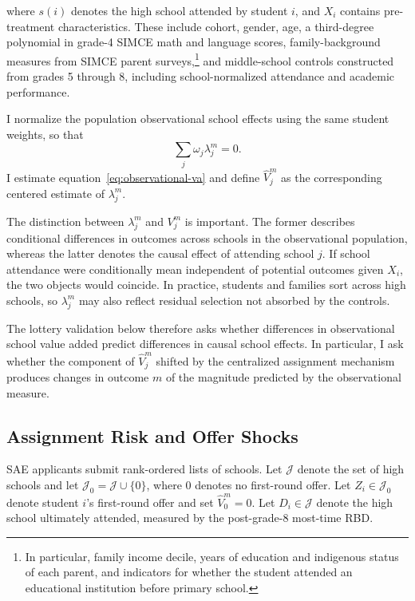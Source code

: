 \documentclass[a4paper, article, english, oneside, unknownkeysallowed, 12pt]{memoir}
\begin{document}
where $s(i)$ denotes the high school attended by student $i$, and $X_i$ contains
pre-treatment characteristics. These include cohort, gender, age, a third-degree
polynomial in grade-4 SIMCE math and language scores, family-background measures
from SIMCE parent surveys,\footnote{In particular, family income decile, years of
education and indigenous status of each parent, and indicators for whether the student
attended an educational institution before primary school.} and middle-school controls
constructed from grades 5 through 8, including school-normalized attendance and
academic performance.

I normalize the population observational school effects using the same student weights,
so that
\[
    \sum_j \omega_j \lambda_j^m = 0.
\]
I estimate equation~\eqref{eq:observational-va} and define
$\widehat V_j^m$ as the corresponding centered estimate of $\lambda_j^m$.

The distinction between $\lambda_j^m$ and $V_j^m$ is important. The former describes
conditional differences in outcomes across schools in the observational population,
whereas the latter denotes the causal effect of attending school $j$. If school attendance
were conditionally mean independent of potential outcomes given $X_i$, the two objects
would coincide. In practice, students and families sort across high schools, so
$\lambda_j^m$ may also reflect residual selection not absorbed by the controls.

The lottery validation below therefore asks whether differences in observational school
value added predict differences in causal school effects. In particular, I ask whether the
component of $\widehat V_j^m$ shifted by the centralized assignment mechanism produces
changes in outcome $m$ of the magnitude predicted by the observational measure.


\subsection{Assignment Risk and Offer Shocks}

SAE applicants submit rank-ordered lists of schools. Let $\mathcal J$ denote the set of high
schools and let $\mathcal J_0=\mathcal J\cup\{0\}$, where $0$ denotes no first-round offer.
Let $Z_i\in\mathcal J_0$ denote student $i$'s first-round offer and set
$\widehat V_0^m=0$. Let $D_i\in\mathcal J$ denote the high school ultimately attended,
measured by the post-grade-8 most-time RBD.
\end{document}
